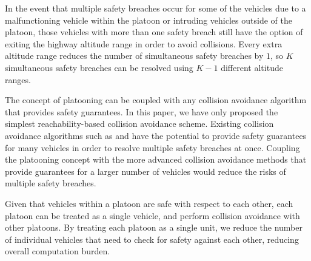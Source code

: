 In the event that multiple safety breaches occur for some of the vehicles due to a malfunctioning vehicle within the platoon or intruding vehicles outside of the platoon, those vehicles with more than one safety breach still have the option of exiting the highway altitude range in order to avoid collisions. Every extra altitude range reduces the number of simultaneous safety breaches by $1$, so $K$ simultaneous safety breaches can be resolved using $K-1$ different altitude ranges. 

The concept of platooning can be coupled with any collision avoidance algorithm that provides safety guarantees. In this paper, we have only proposed the simplest reachability-based collision avoidance scheme. Existing collision avoidance algorithms such as \cite{Bansal16} and \cite{Chen16} have the potential to provide safety guarantees for many vehicles in order to resolve multiple safety breaches at once. Coupling the platooning concept with the more advanced collision avoidance methods that provide guarantees for a larger number of vehicles would reduce the risks of multiple safety breaches.

Given that vehicles within a platoon are safe with respect to each other, each platoon can be treated as a single vehicle, and perform collision avoidance with other platoons. By treating each platoon as a single unit, we reduce the number of individual vehicles that need to check for safety against each other, reducing overall computation burden.